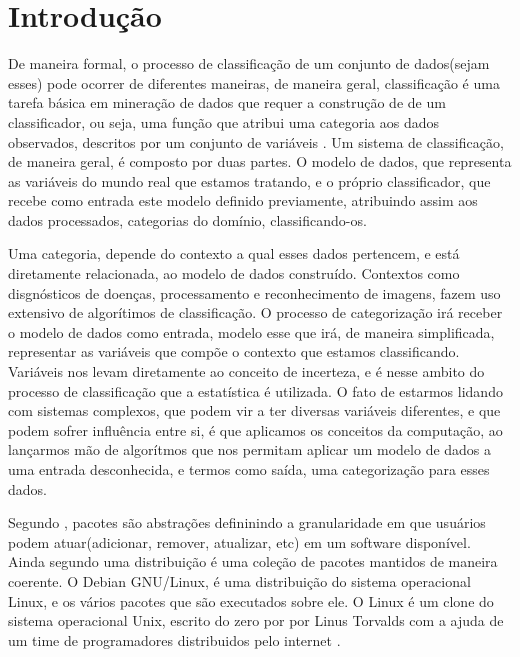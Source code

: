 \chapter*[Introdução]{Introdução}

De maneira formal, o processo de classificação de um conjunto de dados(sejam esses) pode ocorrer de diferentes maneiras, de maneira geral, classificação é uma tarefa básica em mineração de dados que requer a construção de de um classificador, ou seja, uma função que atribui uma categoria aos dados observados, descritos por um conjunto de variáveis \cite{Taheri}. Um sistema de classificação,
de maneira geral, é composto por duas partes. O modelo de dados, que representa as variáveis do mundo real que estamos tratando, e o próprio classificador, que recebe
como entrada este modelo definido previamente, atribuindo assim aos dados processados, categorias do domínio, classificando-os.

 Uma categoria, depende do contexto a qual esses dados pertencem, e está diretamente relacionada, ao modelo de dados construído. Contextos como disgnósticos de doenças, processamento e reconhecimento de imagens, fazem uso extensivo de algorítimos de classificação. O processo de categorização irá receber o modelo de dados como entrada, modelo esse que irá, de maneira simplificada, representar as variáveis que compõe o contexto que estamos classificando. Variáveis nos levam diretamente ao conceito de incerteza, e é nesse ambito do processo de classificação que a estatística é utilizada. O fato de estarmos lidando com sistemas complexos, que podem vir a ter diversas variáveis diferentes, e que podem sofrer influência entre si, é que aplicamos os conceitos da computação, ao lançarmos mão de algorítmos que nos permitam aplicar um modelo de dados a uma entrada desconhecida, e termos como saída, uma categorização para esses dados. 



Segundo \cite{Zacchiroli}, pacotes são abstrações defininindo a granularidade em que usuários podem atuar(adicionar, remover, atualizar, etc) em um software disponível. Ainda
segundo \cite{Zacchiroli} uma distribuição é uma coleção de pacotes mantidos de maneira coerente.
O Debian GNU/Linux, é uma distribuição do sistema operacional Linux, e os vários pacotes que são executados sobre ele\cite{Debian}.
O Linux é um clone do sistema operacional Unix, escrito do zero por por Linus Torvalds com a ajuda de um time de programadores distribuidos pelo internet \cite{Linux}.

